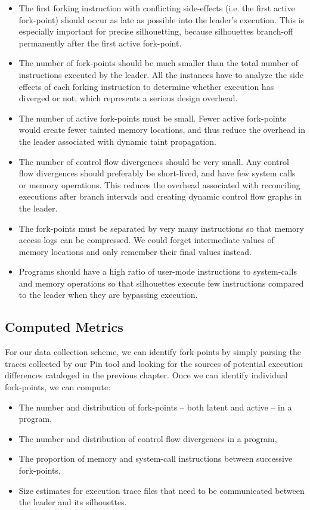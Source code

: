\begin{itemize}
\item The first forking instruction
with conflicting side-effects (i.e. the first 
active fork-point) should occur as late as possible 
into the leader's execution.
This is especially important for precise silhouetting,
because silhouettes branch-off
permanently after the first
active fork-point.

\item The number of fork-points should
be much smaller than the total number of instructions executed
by the leader.
All the instances
have to analyze the side effects
of each forking instruction
to determine whether execution has 
diverged or not, which represents 
a serious design overhead.

\item The number of active fork-points
must be small. Fewer 
active fork-points would 
create fewer tainted memory locations,
and thus reduce the overhead
in the leader associated with dynamic
taint propagation.

\item The number of control flow divergences
should be very small. Any control flow divergences
should preferably be short-lived, and have
few system calls or memory operations.
This reduces the overhead
associated with reconciling
executions after branch intervals
and creating dynamic control
flow graphs in the leader.

\item The fork-points must be separated 
by very many instructions so that
memory access logs can be compressed. 
We could forget intermediate
values of memory locations and only
remember their final values instead.

\item Programs should have a high
ratio of user-mode instructions to system-calls
and memory operations so that
silhouettes execute few
instructions compared to
the leader when they are bypassing execution. 

\end{itemize}

\subsection{Computed Metrics}
For our data collection scheme, we can identify fork-points by 
simply parsing the traces collected by our Pin tool
and looking for the sources of potential execution
differences cataloged in the previous chapter. 
Once we can identify individual fork-points, we can compute:
\begin{itemize}
\item The number and distribution of fork-points -- both latent and active -- in a program,
\item The number and distribution of control flow divergences in a program,
\item The proportion of memory and system-call instructions between successive fork-points,
\item Size estimates for execution trace files that need to be communicated between
  the leader and its silhouettes.
\end{itemize}

